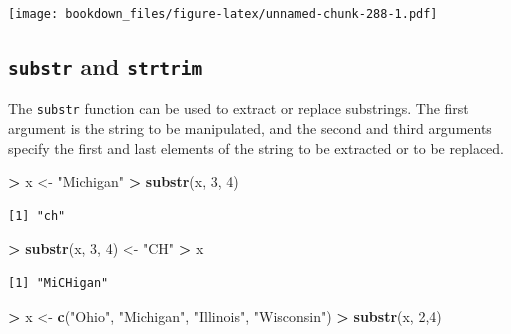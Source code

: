 \documentclass[
]{krantz}
\makeatletter
\newenvironment{Shaded}{\begin{snugshade}}{\end{snugshade}}
\newcommand{\DecValTok}[1]{\textcolor[rgb]{0.06,0.06,0.06}{#1}}
\newcommand{\KeywordTok}[1]{\textcolor[rgb]{0.27,0.27,0.27}{\textbf{#1}}}
\newcommand{\NormalTok}[1]{#1}
\newcommand{\OperatorTok}[1]{\textcolor[rgb]{0.43,0.43,0.43}{\textbf{#1}}}
\newcommand{\StringTok}[1]{\textcolor[rgb]{0.5,0.5,0.5}{#1}}
\newenvironment{kframe}{%
\medskip{}
\setlength{\fboxsep}{.8em}
 \def\at@end@of@kframe{}%
 \ifinner\ifhmode%
  \def\at@end@of@kframe{\end{minipage}}%
  \begin{minipage}{\columnwidth}%
 \fi\fi%
 \def\FrameCommand##1{\hskip\@totalleftmargin \hskip-\fboxsep
 \colorbox{shadecolor}{##1}\hskip-\fboxsep
     \hskip-\linewidth \hskip-\@totalleftmargin \hskip\columnwidth}%
 \MakeFramed {\advance\hsize-\width
   \@totalleftmargin\z@ \linewidth\hsize
   \@setminipage}}%
 {\par\unskip\endMakeFramed%
 \at@end@of@kframe}
\renewenvironment{Shaded}{\begin{kframe}}{\end{kframe}}
\makeatother
\begin{document}
\texttt{[image: bookdown\_files/figure-latex/unnamed-chunk-288-1.pdf]}

\hypertarget{substr-and-strtrim}{%
\subsection{\texorpdfstring{\texttt{substr} and \texttt{strtrim}}{substr and strtrim}}\label{substr-and-strtrim}}

The \texttt{substr} function can be used to extract or replace substrings. The first argument is the string to be manipulated, and the second and third arguments specify the first and last elements of the string to be extracted or to be replaced.

\begin{Shaded}
\begin{Highlighting}[]
\OperatorTok{\textgreater{}}\StringTok{ }\NormalTok{x \textless{}{-}}\StringTok{ "Michigan"}
\OperatorTok{\textgreater{}}\StringTok{ }\KeywordTok{substr}\NormalTok{(x, }\DecValTok{3}\NormalTok{, }\DecValTok{4}\NormalTok{)}
\end{Highlighting}
\end{Shaded}

\begin{verbatim}
[1] "ch"
\end{verbatim}

\begin{Shaded}
\begin{Highlighting}[]
\OperatorTok{\textgreater{}}\StringTok{ }\KeywordTok{substr}\NormalTok{(x, }\DecValTok{3}\NormalTok{, }\DecValTok{4}\NormalTok{) \textless{}{-}}\StringTok{ "CH"}
\OperatorTok{\textgreater{}}\StringTok{ }\NormalTok{x}
\end{Highlighting}
\end{Shaded}

\begin{verbatim}
[1] "MiCHigan"
\end{verbatim}

\begin{Shaded}
\begin{Highlighting}[]
\OperatorTok{\textgreater{}}\StringTok{ }\NormalTok{x \textless{}{-}}\StringTok{ }\KeywordTok{c}\NormalTok{(}\StringTok{"Ohio"}\NormalTok{, }\StringTok{"Michigan"}\NormalTok{, }\StringTok{"Illinois"}\NormalTok{, }\StringTok{"Wisconsin"}\NormalTok{)}
\OperatorTok{\textgreater{}}\StringTok{ }\KeywordTok{substr}\NormalTok{(x, }\DecValTok{2}\NormalTok{,}\DecValTok{4}\NormalTok{)}
\end{Highlighting}
\end{Shaded}
\end{document}
